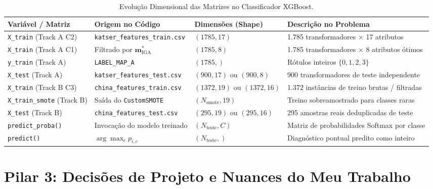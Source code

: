 \documentclass[11pt,a4paper]{article}
\begin{document}
\begin{table}[htbp]
  \centering\small
  \caption{Evolução Dimensional das Matrizes no Classificador XGBoost.}
  \label{tab:xgb_shapes}
  \begin{tabularx}{\textwidth}{l p{4.5cm} l X}
    \toprule
    \textbf{Variável / Matriz} & \textbf{Origem no Código} & \textbf{Dimensões (Shape)} & \textbf{Descrição no Problema} \\
    \midrule
    \texttt{X\_train} (Track A C2) & \texttt{katser\_features\_train.csv} & $(1785, 17)$ & 1.785 transformadores $\times$ 17 atributos \\
    \texttt{X\_train} (Track A C1) & Filtrado por $\mathbf{m}^*_{\text{IGA}}$ & $(1785, 8)$ & 1.785 transformadores $\times$ 8 atributos ótimos \\
    \texttt{y\_train} (Track A) & \texttt{LABEL\_MAP\_A} & $(1785,)$ & Rótulos inteiros $\{0, 1, 2, 3\}$ \\
    \texttt{X\_test} (Track A) & \texttt{katser\_features\_test.csv} & $(900, 17)$ ou $(900, 8)$ & 900 transformadores de teste independente \\
    \texttt{X\_train} (Track B C3) & \texttt{china\_features\_train.csv} & $(1372, 19)$ ou $(1372, 16)$ & 1.372 instâncias de treino brutas / filtradas \\
    \texttt{X\_train\_smote} (Track B) & Saída do \texttt{CustomSMOTE} & $(N_{\text{smote}}, 19)$ & Treino sobreamostrado para classes raras \\
    \texttt{X\_test} (Track B) & \texttt{china\_features\_test.csv} & $(295, 19)$ ou $(295, 16)$ & 295 amostras reais deduplicadas de teste \\
    \texttt{predict\_proba()} & Invocação do modelo treinado & $(N_{\text{teste}}, C)$ & Matriz de probabilidades Softmax por classe \\
    \texttt{predict()} & $\arg\max_c p_{i, c}$ & $(N_{\text{teste}},)$ & Diagnóstico pontual predito como inteiro \\
    \bottomrule
  \end{tabularx}
\end{table}

\vspace{0.4cm}
\section{Pilar 3: Decisões de Projeto e Nuances do Meu Trabalho}
\end{document}
